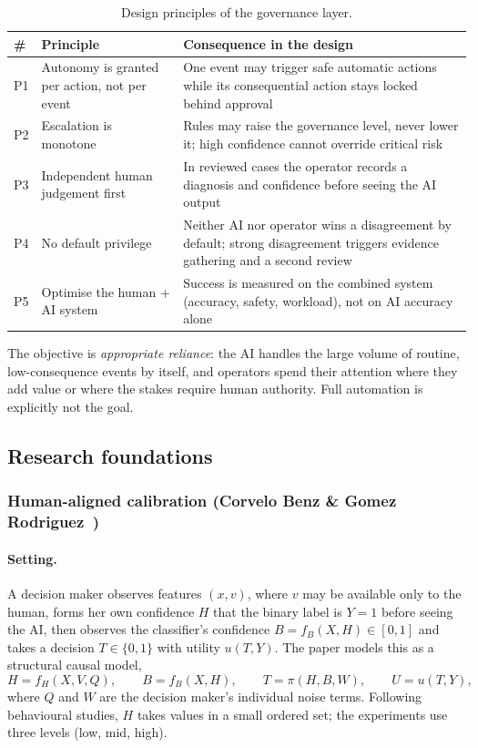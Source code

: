 \documentclass[11pt,a4paper]{article}
\renewcommand{\_}{\textunderscore\allowbreak}
\begin{document}
\begin{table}[H]
\centering\small
\begin{tabularx}{\textwidth}{@{}>{\raggedright\arraybackslash}p{0.6cm}>{\raggedright\arraybackslash}p{4.4cm}L@{}}
\toprule
\textbf{\#} & \textbf{Principle} & \textbf{Consequence in the design} \\
\midrule
P1 & Autonomy is granted per action, not per event & One event may trigger safe automatic actions while its consequential action stays locked behind approval \\
P2 & Escalation is monotone & Rules may raise the governance level, never lower it; high confidence cannot override critical risk \\
P3 & Independent human judgement first & In reviewed cases the operator records a diagnosis and confidence before seeing the AI output \\
P4 & No default privilege & Neither AI nor operator wins a disagreement by default; strong disagreement triggers evidence gathering and a second review \\
P5 & Optimise the human + AI system & Success is measured on the combined system (accuracy, safety, workload), not on AI accuracy alone \\
\bottomrule
\end{tabularx}
\caption{Design principles of the governance layer.}
\label{tab:principles}
\end{table}

The objective is \emph{appropriate reliance}: the AI handles the large volume of routine, low-consequence
events by itself, and operators spend their attention where they add value or where the stakes require human
authority. Full automation is explicitly not the goal.

\subsection{Research foundations}

\subsubsection{Human-aligned calibration (Corvelo Benz \& Gomez Rodriguez~\cite{benz})}
\paragraph{Setting.} A decision maker observes features $(x,v)$, where $v$ may be available only to the human,
forms her own confidence $H$ that the binary label is $Y=1$ before seeing the AI, then observes the
classifier's confidence $B=f_B(X,H)\in[0,1]$ and takes a decision $T\in\{0,1\}$ with utility $u(T,Y)$. The paper
models this as a structural causal model,
\begin{equation}
H=f_H(X,V,Q),\qquad B=f_B(X,H),\qquad T=\pi(H,B,W),\qquad U=u(T,Y),
\end{equation}
where $Q$ and $W$ are the decision maker's individual noise terms. Following behavioural studies, $H$ takes
values in a small ordered set; the experiments use three levels (low, mid, high).
\end{document}

